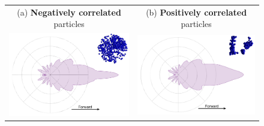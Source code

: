 \begin{figure}
    \centering
    \setlength{\resLen}{0.8in}
    \addtolength{\tabcolsep}{-3.5pt}
    \small
    \begin{tabular}{cc|cc}
        \multicolumn{2}{c|}{(a) \textbf{Negatively correlated} particles} &
        \multicolumn{2}{c}{(b) \textbf{Positively correlated} particles}
        \\
        \multicolumn{2}{c|}{\includegraphics[width=2\resLen]{images/pfunc/negative.png}} & \multicolumn{2}{c}{\includegraphics[width=2\resLen]{images/pfunc/positive.png}} 
        \\

\end{tabular}
\end{figure}
